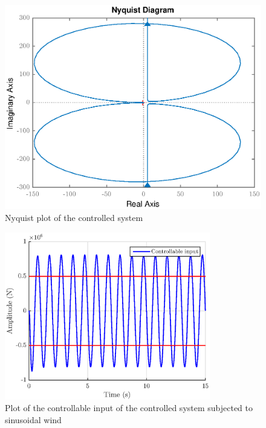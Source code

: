 \begin{figure}[H]
    \centering
    \includegraphics[scale = 0.8]{resources/eps/4-Val/L_nyq.eps}
    \caption{Nyquist plot of the controlled system}
    \label{fig:nyquist-control}
\end{figure}
\begin{figure}[H]
    \centering
    \includegraphics[width=0.8\textwidth]{resources/eps/4-Val/sin_force.eps}
    \caption{Plot of the controllable input of the controlled system subjected to sinusoidal wind}
    \label{fig:controllable-input}
\end{figure}

